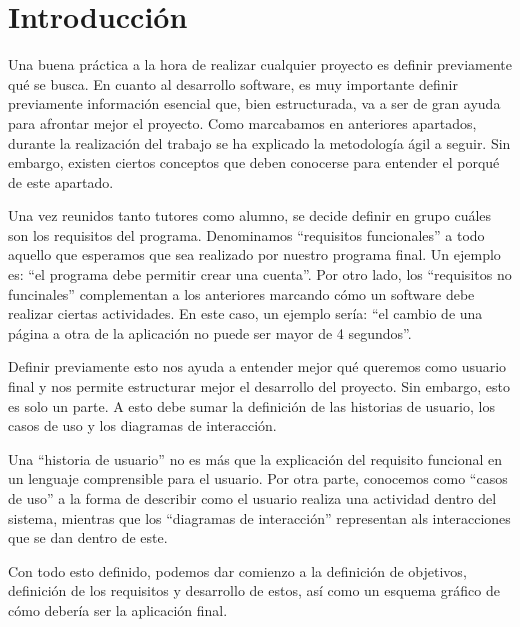 
\section{Introducción}

	Una buena práctica a la hora de realizar cualquier proyecto es definir previamente qué se busca. En cuanto al desarrollo software, es muy importante definir previamente información esencial que, bien estructurada, va a ser de gran ayuda para afrontar mejor el proyecto. Como marcabamos en anteriores apartados, durante la realización del trabajo se ha explicado la metodología ágil a seguir. Sin embargo, existen ciertos conceptos que deben conocerse para entender el porqué de este apartado.	
	
	Una vez reunidos tanto tutores como alumno, se decide definir en grupo cuáles son los requisitos del programa. Denominamos ``requisitos funcionales'' a todo aquello que esperamos que sea realizado por nuestro programa final. Un ejemplo es: ``el programa debe permitir crear una cuenta''. Por otro lado, los ``requisitos no funcinales'' complementan a los anteriores marcando cómo un software debe realizar ciertas actividades. En este caso, un ejemplo sería: ``el cambio de una página a otra de la aplicación no puede ser mayor de 4 segundos''.
	
	Definir previamente esto nos ayuda a entender mejor qué queremos como usuario final y nos permite estructurar mejor el desarrollo del proyecto. Sin embargo, esto es solo un parte. A esto debe sumar la definición de las historias de usuario, los casos de uso y los diagramas de interacción.
	
	Una ``historia de usuario'' no es más que la explicación del requisito funcional en un lenguaje comprensible para el usuario. Por otra parte, conocemos como ``casos de uso'' a la forma de describir como el usuario realiza una actividad dentro del sistema, mientras que los ``diagramas de interacción'' representan als interacciones que se dan dentro de este.
	
	Con todo esto definido, podemos dar comienzo a la definición de objetivos, definición de los requisitos y desarrollo de estos, así como un esquema gráfico de cómo debería ser la aplicación final.


